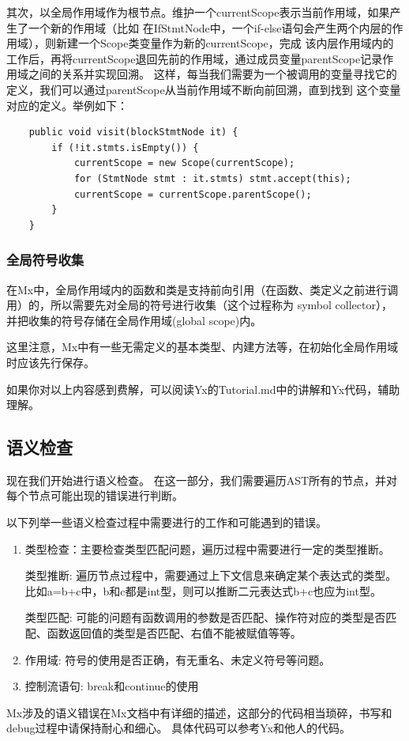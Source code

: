 其次，以全局作用域作为根节点。维护一个currentScope表示当前作用域，如果产生了一个新的作用域（比如
在IfStmtNode中，一个if-else语句会产生两个内层的作用域），则新建一个Scope类变量作为新的currentScope，完成
该内层作用域内的工作后，再将currentScope退回先前的作用域，通过成员变量parentScope记录作用域之间的关系并实现回溯。
这样，每当我们需要为一个被调用的变量寻找它的定义，我们可以通过parentScope从当前作用域不断向前回溯，直到找到
这个变量对应的定义。举例如下：
\begin{lstlisting}
    public void visit(blockStmtNode it) {
        if (!it.stmts.isEmpty()) {
            currentScope = new Scope(currentScope);
            for (StmtNode stmt : it.stmts) stmt.accept(this);
            currentScope = currentScope.parentScope();
        }
    }
\end{lstlisting}

\subsubsection{全局符号收集}
在Mx中，全局作用域内的函数和类是支持前向引用（在函数、类定义之前进行调用）的，所以需要先对全局的符号进行收集（这个过程称为 symbol collector），
并把收集的符号存储在全局作用域(global scope)内。

这里注意，Mx中有一些无需定义的基本类型、内建方法等，在初始化全局作用域时应该先行保存。

如果你对以上内容感到费解，可以阅读Yx的Tutorial.md中的讲解和Yx代码，辅助理解。

\subsection{语义检查}
现在我们开始进行语义检查。
在这一部分，我们需要遍历AST所有的节点，并对每个节点可能出现的错误进行判断。

以下列举一些语义检查过程中需要进行的工作和可能遇到的错误。

\begin{enumerate}
    \item 类型检查：主要检查类型匹配问题，遍历过程中需要进行一定的类型推断。
    
    类型推断: 遍历节点过程中，需要通过上下文信息来确定某个表达式的类型。
    比如a=b+c中，b和c都是int型，则可以推断二元表达式b+c也应为int型。

    类型匹配: 可能的问题有函数调用的参数是否匹配、操作符对应的类型是否匹配、函数返回值的类型是否匹配、右值不能被赋值等等。
    \item 作用域: 符号的使用是否正确，有无重名、未定义符号等问题。
    \item 控制流语句: break和continue的使用
\end{enumerate}


Mx涉及的语义错误在Mx文档中有详细的描述，这部分的代码相当琐碎，书写和debug过程中请保持耐心和细心。
具体代码可以参考Yx和他人的代码。

